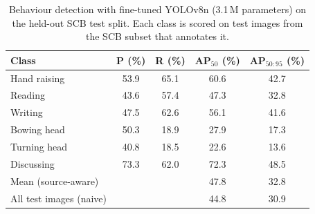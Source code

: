 \begin{table}[H]
\caption{Behaviour detection with fine-tuned YOLOv8n (3.1\,M parameters) on the held-out SCB test split. Each class is scored on test images from the SCB subset that annotates it.}
\centering
\label{tab:act}
\begin{tabular}{lcccc}
\toprule
\bf Class & \bf P (\%) & \bf R (\%) & \bf AP$_{50}$ (\%) & \bf AP$_{50:95}$ (\%) \\
\midrule
Hand raising & 53.9 & 65.1 & 60.6 & 42.7 \\
Reading & 43.6 & 57.4 & 47.3 & 32.8 \\
Writing & 47.5 & 62.6 & 56.1 & 41.6 \\
Bowing head & 50.3 & 18.9 & 27.9 & 17.3 \\
Turning head & 40.8 & 18.5 & 22.6 & 13.6 \\
Discussing & 73.3 & 62.0 & 72.3 & 48.5 \\
\midrule
Mean (source-aware) & & & 47.8 & 32.8 \\
All test images (naive) & & & 44.8 & 30.9 \\
\bottomrule
\end{tabular}
\end{table}
